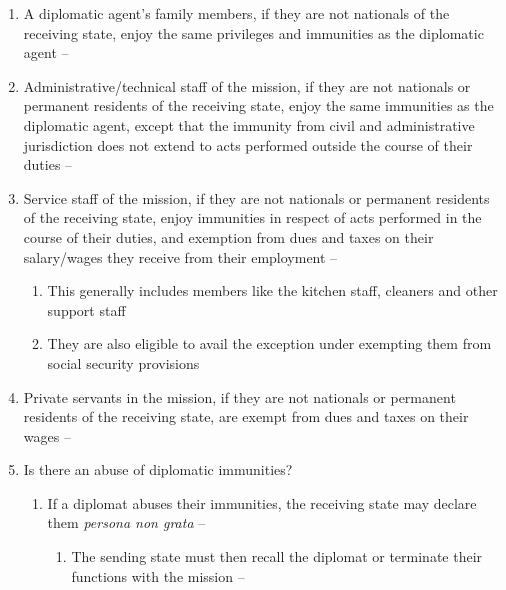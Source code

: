 \begin{enumerate}
\begin{enumerate}
\begin{enumerate}
\begin{enumerate}
            \end{enumerate}
        \end{enumerate}
        \item A diplomatic agent's family members, if they are not nationals of the receiving state, enjoy the same privileges and immunities as the diplomatic agent -- 
        \item Administrative/technical staff of the mission, if they are not nationals or permanent residents of the receiving state, enjoy the same immunities as the diplomatic agent, except that the immunity from civil and administrative jurisdiction does not extend to acts performed outside the course of their duties -- 
        \item Service staff of the mission, if they are not nationals or permanent residents of the receiving state, enjoy immunities in respect of acts performed in the course of their duties, and exemption from dues and taxes on their salary/wages they receive from their employment -- 
        \begin{enumerate}
            \item This generally includes members like the kitchen staff, cleaners and other support staff
            \item They are also eligible to avail the exception under  exempting them from social security provisions
        \end{enumerate}
        \item Private servants in the mission, if they are not nationals or permanent residents of the receiving state, are exempt from dues and taxes on their wages -- 
        \item Is there an abuse of diplomatic immunities?
        \begin{enumerate}
            \item If a diplomat abuses their immunities, the receiving state may declare them \textit{persona non grata} -- 
            \begin{enumerate}
                \item The sending state must then recall the diplomat or terminate their functions with the mission -- 

\end{enumerate}
\end{enumerate}
\end{enumerate}
\end{enumerate}
